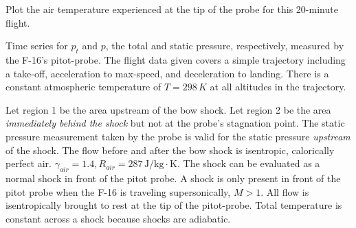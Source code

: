 \documentclass[../main.tex]{subfiles}
\begin{document}
\clearpage

 Plot the air temperature experienced at the tip of the probe for this 20-minute flight.

\givens{}

Time series for \(p_t\) and \(p\), the total and static pressure, respectively, measured by the F-16's pitot-probe.
The flight data given covers a simple trajectory including a take-off, acceleration to max-speed, and deceleration to landing.
There is a constant atmospheric temperature of \(T=298\,K\) at all altitudes in the trajectory.

\assumptions{}

Let region 1 be the area upstream of the bow shock.
Let region 2 be the area \textit{immediately behind the shock} but not at the probe's stagnation point.
The static pressure measurement taken by the probe is valid for the static pressure \textit{upstream} of the shock.
The flow before and after the bow shock is isentropic, calorically perfect air. \(\gamma_{air} = 1.4, R_{air} = 287 \, \unit{\joule/\kilogram\cdot\kelvin}\).
The shock can be evaluated as a normal shock in front of the pitot probe.
A shock is only present in front of the pitot probe when the F-16 is traveling supersonically, \(M > 1\).
All flow is isentropically brought to rest at the tip of the pitot-probe. Total temperature is constant across a shock because shocks are adiabatic.

\solution{}
\end{document}
